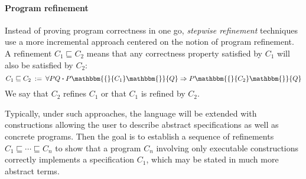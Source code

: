 \documentclass[draft,11pt]{report}
\newcommand{\bdot}{\boldsymbol{\cdot}}
\newcommand{\htr}[3]{{ {#1} \mathbbm{\{} {#2} \mathbbm{\}} {#3} }}
\begin{document}


%
%

\paragraph{Program refinement} %

Instead of proving program correctness in one go,
\emph{stepwise refinement} techniques use a more incremental approach
centered on the notion of program refinement.
A refinement $C_1 \sqsubseteq C_2$
means that any correctness property satisfied by $C_1$
will also be satisfied by $C_2$:
\[
    C_1 \sqsubseteq C_2 \: := \:
    \forall P Q \bdot
      \htr{P}{C_1}{Q} \Rightarrow
      \htr{P}{C_2}{Q}
\]
We say that $C_2$ refines $C_1$
or that $C_1$ is refined by $C_2$.

Typically,
under such approaches,
the language will be extended with constructions
allowing the user to describe
abstract specifications as well as
concrete programs.
Then the goal is to establish
a sequence of refinements
$C_1 \sqsubseteq \cdots \sqsubseteq C_n$
to show that a program $C_n$ involving
only executable constructions
correctly implements a specification $C_1$,
which may be stated in much more abstract terms.
\end{document}
